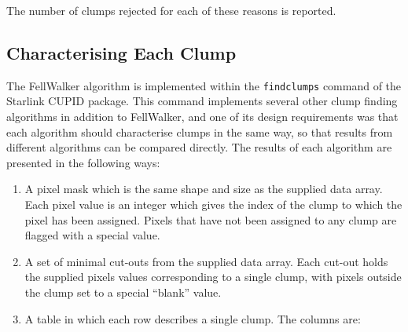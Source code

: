 \documentclass[final,authoryear,5p,times,twocolumn]{elsarticle}
\begin{document}
The number of clumps rejected for each of these reasons is reported.

\subsection{Characterising Each Clump}
The FellWalker algorithm is implemented within the {\tt findclumps}
command of the Starlink CUPID package. This
command implements several other clump finding algorithms in addition to
FellWalker, and one of its design requirements was that each algorithm should characterise clumps in
the same way, so that results from different algorithms can be compared
directly. The results of each algorithm are presented in the following ways:

\begin{enumerate}

\item A pixel mask which is the same shape and size as the supplied data
array. Each pixel value is an integer which gives the index of the clump
to which the pixel has been assigned. Pixels that have not been assigned
to any clump are flagged with a special value.

\item A set of minimal cut-outs from the supplied data array. Each cut-out
holds the supplied pixels values corresponding to a single clump, with pixels
outside the clump set to a special ``blank'' value.

\item A table in which each row describes a single clump. The columns are:


\end{enumerate}
\end{document}
